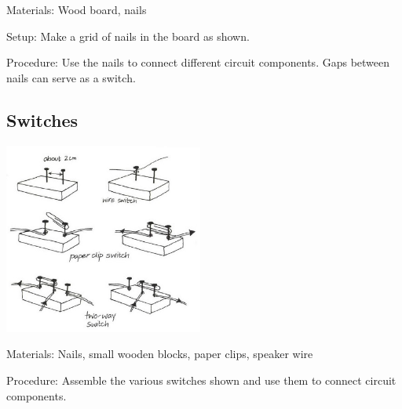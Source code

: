\begin{multicols}{2}
\begin{description*}
\item[Materials:]{Wood board, nails}
\item[Setup:]{Make a grid of nails in the board as shown.}
\item[Procedure:]{Use the nails to connect different circuit components. Gaps between nails can serve as a switch.}
\end{description*}

\subsection{Switches}

\begin{center}
\includegraphics[width=0.49\textwidth]{./img/vso/switches.jpg}
\end{center}

\begin{description*}
\item[Materials:]{Nails, small wooden blocks, paper clips, speaker wire}
\item[Procedure:]{Assemble the various switches shown and use them to connect circuit components.}
\end{description*}


\end{multicols}
